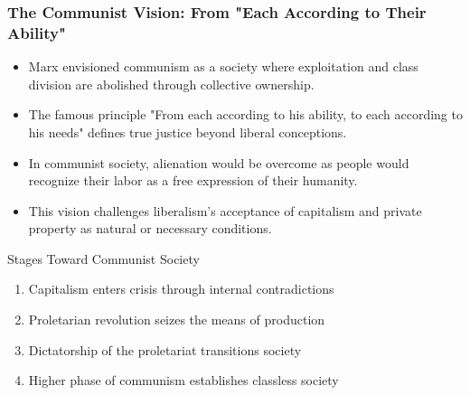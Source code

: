 \documentclass{beamer}
\begin{document}
\begin{frame}
\frametitle{The Communist Vision: From "Each According to Their Ability"}
\begin{itemize}
    \item Marx envisioned communism as a society where exploitation and class division are abolished through collective ownership.
    \item The famous principle "From each according to his ability, to each according to his needs" defines true justice beyond liberal conceptions.
    \item In communist society, alienation would be overcome as people would recognize their labor as a free expression of their humanity.
    \item This vision challenges liberalism's acceptance of capitalism and private property as natural or necessary conditions.
\end{itemize}

\begin{block}{Stages Toward Communist Society}
\begin{enumerate}
    \item Capitalism enters crisis through internal contradictions
    \item Proletarian revolution seizes the means of production
    \item Dictatorship of the proletariat transitions society
    \item Higher phase of communism establishes classless society
\end{enumerate}
\end{block}
\end{frame}
\end{document}
